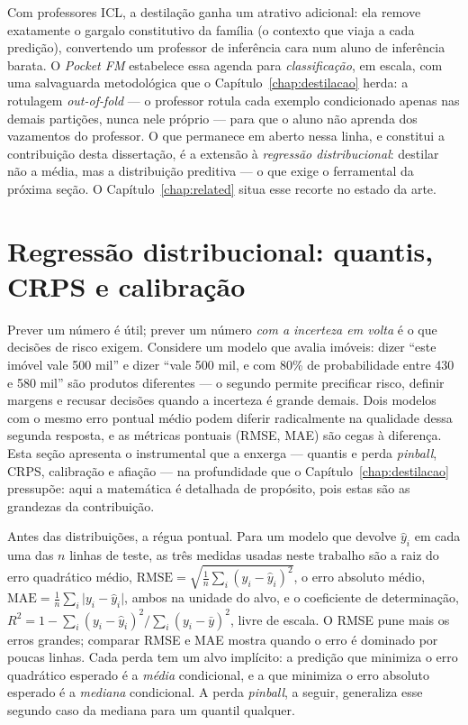 Com professores
ICL, a destilação ganha um atrativo adicional: ela remove exatamente o
gargalo constitutivo da família (o contexto que viaja a cada predição),
convertendo um professor de inferência cara num aluno de inferência
barata. O \emph{Pocket FM} \citep{pocketfm2026} estabelece essa agenda para
\emph{classificação}, em escala, com uma salvaguarda metodológica que o
Capítulo~\ref{chap:destilacao} herda: a rotulagem \emph{out-of-fold} --- o professor rotula
cada exemplo condicionado apenas nas demais partições, nunca nele próprio
--- para que o aluno não aprenda dos vazamentos do professor. O que
permanece em aberto nessa linha, e constitui a contribuição desta
dissertação, é a extensão à \emph{regressão distribucional}: destilar não a
média, mas a distribuição preditiva --- o que exige o ferramental da
próxima seção. O Capítulo~\ref{chap:related} situa esse recorte no estado da arte.

\section{Regressão distribucional: quantis, CRPS e calibração}
\label{sec:fund-distribucional}

Prever um número é útil; prever um número \emph{com a incerteza em volta} é
o que decisões de risco exigem. Considere um modelo que avalia imóveis:
dizer ``este imóvel vale 500 mil'' e dizer ``vale 500 mil, e com 80\% de
probabilidade entre 430 e 580 mil'' são produtos diferentes --- o segundo
permite precificar risco, definir margens e recusar decisões quando a
incerteza é grande demais. Dois modelos com o mesmo erro pontual médio
podem diferir radicalmente na qualidade dessa segunda resposta, e as
métricas pontuais (RMSE, MAE) são cegas à diferença. Esta seção apresenta
o instrumental que a enxerga --- quantis e perda \emph{pinball}, CRPS,
calibração e afiação --- na profundidade que o Capítulo~\ref{chap:destilacao} pressupõe: aqui
a matemática é detalhada de propósito, pois estas são as grandezas da
contribuição.

Antes das distribuições, a régua pontual. Para um modelo que devolve
$\hat y_i$ em cada uma das $n$ linhas de teste, as três medidas usadas
neste trabalho são a raiz do erro quadrático médio,
$\mathrm{RMSE} = \sqrt{\tfrac{1}{n}\sum_i (y_i - \hat y_i)^2}$, o
erro absoluto médio,
$\mathrm{MAE} = \tfrac{1}{n}\sum_i \lvert y_i - \hat y_i \rvert$,
ambos na unidade do alvo, e o coeficiente de determinação,
$R^2 = 1 - \sum_i (y_i - \hat y_i)^2 / \sum_i (y_i - \bar y)^2$,
livre de escala. O RMSE pune mais os erros grandes; comparar RMSE e
MAE mostra quando o erro é dominado por poucas linhas. Cada perda tem
um alvo implícito: a predição que minimiza o erro quadrático esperado
é a \emph{média} condicional, e a que minimiza o erro absoluto
esperado é a \emph{mediana} condicional. A perda \emph{pinball}, a
seguir, generaliza esse segundo caso da mediana para um quantil
qualquer.

